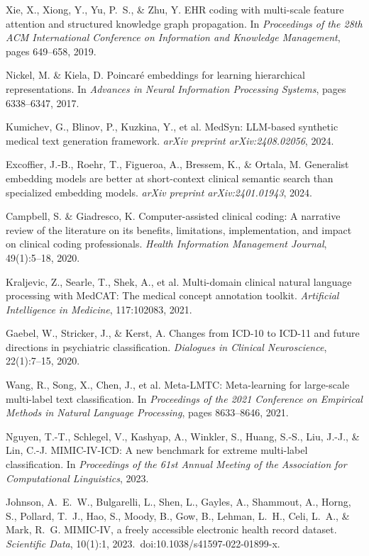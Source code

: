 \documentclass[12pt,a4paper]{report}
\begin{document}
\begin{thebibliography}{99}
Xie, X., Xiong, Y., Yu, P.~S., \& Zhu, Y.
\newblock EHR coding with multi-scale feature attention and structured knowledge graph propagation.
\newblock In \emph{Proceedings of the 28th ACM International Conference on Information and Knowledge Management}, pages 649--658, 2019.

Nickel, M. \& Kiela, D.
\newblock Poincaré embeddings for learning hierarchical representations.
\newblock In \emph{Advances in Neural Information Processing Systems}, pages 6338--6347, 2017.

Kumichev, G., Blinov, P., Kuzkina, Y., et al.
\newblock MedSyn: LLM-based synthetic medical text generation framework.
\newblock \emph{arXiv preprint arXiv:2408.02056}, 2024.

Excoffier, J.-B., Roehr, T., Figueroa, A., Bressem, K., \& Ortala, M.
\newblock Generalist embedding models are better at short-context clinical semantic search than specialized embedding models.
\newblock \emph{arXiv preprint arXiv:2401.01943}, 2024.

Campbell, S. \& Giadresco, K.
\newblock Computer-assisted clinical coding: A narrative review of the literature on its benefits, limitations, implementation, and impact on clinical coding professionals.
\newblock \emph{Health Information Management Journal}, 49(1):5--18, 2020.

Kraljevic, Z., Searle, T., Shek, A., et al.
\newblock Multi-domain clinical natural language processing with MedCAT: The medical concept annotation toolkit.
\newblock \emph{Artificial Intelligence in Medicine}, 117:102083, 2021.

Gaebel, W., Stricker, J., \& Kerst, A.
\newblock Changes from ICD-10 to ICD-11 and future directions in psychiatric classification.
\newblock \emph{Dialogues in Clinical Neuroscience}, 22(1):7--15, 2020.

Wang, R., Song, X., Chen, J., et al.
\newblock Meta-LMTC: Meta-learning for large-scale multi-label text classification.
\newblock In \emph{Proceedings of the 2021 Conference on Empirical Methods in Natural Language Processing}, pages 8633--8646, 2021.

Nguyen, T.-T., Schlegel, V., Kashyap, A., Winkler, S., Huang, S.-S., Liu, J.-J., \& Lin, C.-J.
\newblock MIMIC-IV-ICD: A new benchmark for extreme multi-label classification.
\newblock In \emph{Proceedings of the 61st Annual Meeting of the Association for Computational Linguistics}, 2023.

Johnson, A.~E.~W., Bulgarelli, L., Shen, L., Gayles, A., Shammout, A., Horng, S., Pollard, T.~J., Hao, S., Moody, B., Gow, B., Lehman, L.~H., Celi, L.~A., \& Mark, R.~G.
\newblock MIMIC-IV, a freely accessible electronic health record dataset.
\newblock \emph{Scientific Data}, 10(1):1, 2023.
\newblock \,doi:10.1038/s41597-022-01899-x.

\end{thebibliography}
\end{document}
